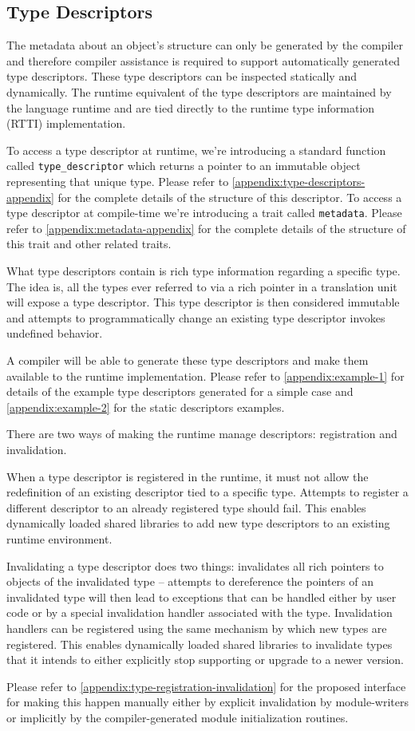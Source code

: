 \subsection{Type Descriptors}

The metadata about an object's structure can only be generated by the compiler
and therefore compiler assistance is required to support automatically generated
type descriptors. These type descriptors can be inspected statically and
dynamically. The runtime equivalent of the type descriptors are maintained by
the language runtime and are tied directly to the runtime type information
(RTTI) implementation.

To access a type descriptor at runtime, we’re introducing a standard function
called \verb+type_descriptor+ which returns a pointer to an immutable object
representing that unique type. Please refer to
\autoref{appendix:type-descriptors-appendix} for the complete details of the
structure of this descriptor. To access a type descriptor at compile-time we're
introducing a trait called \verb+metadata+. Please refer to
\autoref{appendix:metadata-appendix} for the complete details of the structure
of this trait and other related traits.

What type descriptors contain is rich type information regarding a specific
type. The idea is, all the types ever referred to via a rich pointer in a
translation unit will expose a type descriptor. This type descriptor is then
considered immutable and attempts to programmatically change an existing type
descriptor invokes undefined behavior.

A compiler will be able to generate these type descriptors and make them
available to the runtime implementation. Please refer to
\autoref{appendix:example-1} for details of the example type descriptors
generated for a simple case and \autoref{appendix:example-2} for the static
descriptors examples.

There are two ways of making the runtime manage descriptors: registration and
invalidation.

When a type descriptor is registered in the runtime, it must not allow the
redefinition of an existing descriptor tied to a specific type. Attempts to
register a different descriptor to an already registered type should fail. This
enables dynamically loaded shared libraries to add new type descriptors to an
existing runtime environment.

Invalidating a type descriptor does two things: invalidates all rich pointers to
objects of the invalidated type -- attempts to dereference the pointers of an
invalidated type will then lead to exceptions that can be handled either by user
code or by a special invalidation handler associated with the type. Invalidation
handlers can be registered using the same mechanism by which new types are
registered. This enables dynamically loaded shared libraries to invalidate types
that it intends to either explicitly stop supporting or upgrade to a newer
version.

Please refer to \autoref{appendix:type-registration-invalidation} for the
proposed interface for making this happen manually either by explicit
invalidation by module-writers or implicitly by the compiler-generated module
initialization routines.
